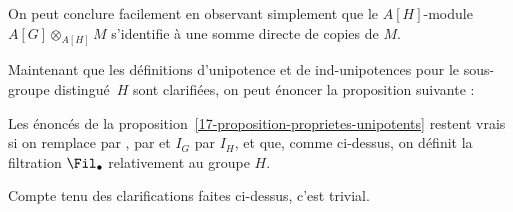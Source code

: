 \documentclass[10pt]{../fichiers-configuration-latex/smfart}
\begin{document}
On peut conclure facilement en observant simplement que le $A[H]$-module
$A[G]\otimes_{A[H]} M$ s'identifie à une somme directe de copies de $M$.

\bigskip

Maintenant que les définitions d'unipotence et de ind-unipotences pour le
sous-groupe distingué $H$ sont clarifiées, on peut énoncer la proposition
suivante :

\begin{proposition2}\label{17-proposition-proprietes-unipotents-sous-groupe-distingue}
Les énoncés de la proposition~\ref{17-proposition-proprietes-unipotents}
restent vrais si on
remplace  par ,
 par  et $I_G$ par $I_H$,
et que, comme ci-dessus, on définit la filtration $\Fil_\bullet$
relativement au groupe $H$.
\end{proposition2}

Compte tenu des clarifications faites ci-dessus, c'est trivial.


\ifx\danslelivre\undefined


\end{document}
